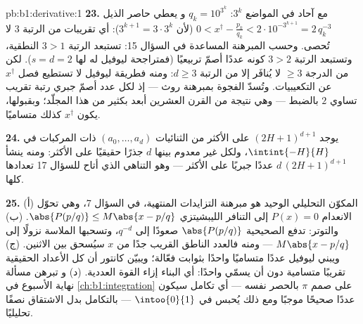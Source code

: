 \begin{solution}{pb:b1:derivative:1}
\textbf{23.} مع آحاد في المواضع $3^k$: $q_k = 10^{3^k}$ و
يعطي حاصر الذيل $0 < x^\dagger - \frac{p_k}{q_k} <
2\cdot10^{-3^{k+1}} = 2\,q_k^{-3}$ (لأن $3^{k+1} = 3\cdot3^k$):
أي تقريبات من الرتبة $3$ لا تُحصى. وحسب المبرهنة المساعدة في
السؤال 15: تستبعد الرتبة $3 > 1$ النطقية، وتستبعد الرتبة $3 >
2$ كونه عددًا أصمّ تربيعيًا (فمتراجحة ليوفيل له
لها $s = d = 2$). لكن  من الدرجة
$\geq 3$ لا يُنافَر إلا من الرتبة $d \geq 3$: ومنه فطريقة
ليوفيل لا تستطيع فصل $x^\dagger$ عن التكعيبيات. وتُسدّ الفجوة
بمبرهنة روث --- إذ لكل عدد أصمّ جبري
رتبة تقريب تساوي $2$ بالضبط --- وهي نتيجة من القرن العشرين
أبعد بكثير من هذا المجلّد؛ وبقبولها، يكون $x^\dagger$ كذلك
متساميًا.

\textbf{24.} يوجد $(2H+1)^{d+1}$ على الأكثر من الثنائيات $(a_0,
\dots, a_d)$ ذات المركبات في $\intint{-H}{H}$، ولكل 
غير معدوم بينها $d$ جذرًا حقيقيًا على الأكثر: ومنه ينشأ
$d\,(2H+1)^{d+1}$ عددًا جبريًا على الأكثر --- وهو التناهي
الذي أتاح للسؤال 17 تعدادها كلها.

\textbf{25.} (أ) المكوّن التحليلي الوحيد هو مبرهنة
التزايدات المنتهية، في السؤال 7، وهي تحوّل الانعدام $P(x) =
0$ إلى التنافر الليبشيتزي $\abs{P(p/q)} \leq M\abs{x -
p/q}$. (ب) والتوتر: تدفع الصحيحية $\abs{P(p/q)}$ صعودًا إلى
$q^{-d}$، وتسحبها الملاسة نزولًا إلى $M\abs{x - p/q}$ --- ومنه فالعدد
الناطق القريب جدًا من $x$ سيُسحق بين الاثنين.
(ج) ويبني ليوفيل عددًا متساميًا واحدًا بثوابت
فعّالة؛ ويبيّن كانتور أن كل الأعداد الحقيقية تقريبًا متسامية
دون أن يسمّي واحدًا: أي البناء إزاء القوة العددية. (د) و
تبرهن مسألة نهاية الأسبوع في \cref{ch:b1:integration} على
صمم $\pi$ بالحصر نفسه --- أي تكامل
سيكون عددًا صحيحًا موجبًا ومع ذلك يُحبس في $\intoo{0}{1}$ ---
بالتكامل بدل الاشتقاق نصفًا
تحليليًا.
\end{solution}
